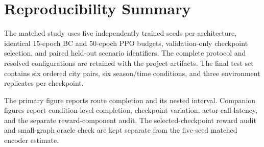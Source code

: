 \documentclass[12pt,a4paper,oneside]{report}
\begin{document}
\appendix
\chapter{Reproducibility Summary}
The matched study uses five independently trained seeds per architecture, identical 15-epoch BC and 50-epoch PPO budgets, validation-only checkpoint selection, and paired held-out scenario identifiers. The complete protocol and resolved configurations are retained with the project artifacts. The final test set contains six ordered city pairs, six season/time conditions, and three environment replicates per checkpoint.

The primary figure reports route completion and its nested interval. Companion figures report condition-level completion, checkpoint variation, actor-call latency, and the separate reward-component audit. The selected-checkpoint reward audit and small-graph oracle check are kept separate from the five-seed matched encoder estimate.


{\small
\setlength{\parskip}{0pt}

}
\end{document}
